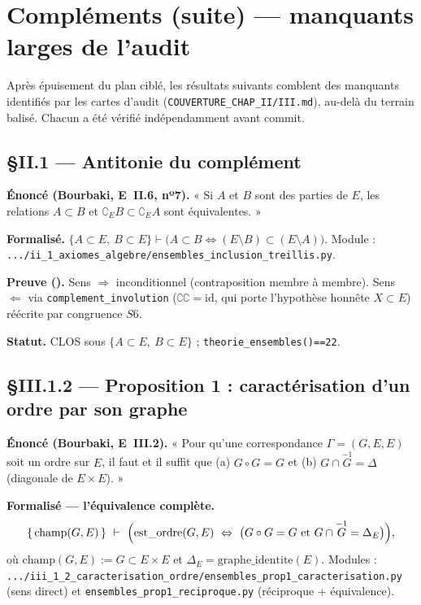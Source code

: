 \section{Compléments (suite) --- manquants larges de l'audit}

Après épuisement du plan ciblé, les résultats suivants comblent des manquants
identifiés par les cartes d'audit (\texttt{COUVERTURE\_CHAP\_II/III.md}), au-delà du
terrain balisé. Chacun a été vérifié indépendamment avant commit.

\subsection{§II.1 --- Antitonie du complément}
\textbf{Énoncé (Bourbaki, E~II.6, nº7).} « Si $A$ et $B$ sont des parties de $E$, les
relations $A\subset B$ et $\complement_E B\subset\complement_E A$ sont équivalentes. »

\textbf{Formalisé.} $\{A\subset E,\ B\subset E\}\vdash\bigl(A\subset B \Leftrightarrow
(E\setminus B)\subset(E\setminus A)\bigr)$. Module :
\texttt{.../ii\_1\_axiomes\_algebre/ensembles\_inclusion\_treillis.py}.

\textbf{Preuve (\Nstar).} Sens $\Rightarrow$ inconditionnel (contraposition membre à
membre). Sens $\Leftarrow$ via \texttt{complement\_involution} ($\complement\complement=\mathrm{id}$,
qui porte l'hypothèse honnête $X\subset E$) réécrite par congruence $S6$.

\textbf{Statut.} CLOS sous $\{A\subset E,\ B\subset E\}$ ; \texttt{theorie\_ensembles()==22}.

\subsection{§III.1.2 --- Proposition 1 : caractérisation d'un ordre par son graphe}
\textbf{Énoncé (Bourbaki, E~III.2).} « Pour qu'une correspondance $\Gamma=(G,E,E)$ soit
un ordre sur $E$, il faut et il suffit que (a) $G\circ G=G$ et (b) $G\cap\overset{-1}{G}=\Delta$
(diagonale de $E\times E$). »

\textbf{Formalisé --- l'équivalence complète.}
\[
  \{\,\mathrm{champ}(G,E)\,\}\ \vdash\ \Bigl(\mathrm{est\_ordre}(G,E)\ \Leftrightarrow\
  \bigl(G\circ G=G\ \text{et}\ G\cap\overset{-1}{G}=\Delta_E\bigr)\Bigr),
\]
où $\mathrm{champ}(G,E):=G\subset E\times E$ et $\Delta_E=\mathrm{graphe\_identite}(E)$.
Modules : \texttt{.../iii\_1\_2\_caracterisation\_ordre/ensembles\_prop1\_caracterisation.py}
(sens direct) et \texttt{ensembles\_prop1\_reciproque.py} (réciproque + équivalence).

